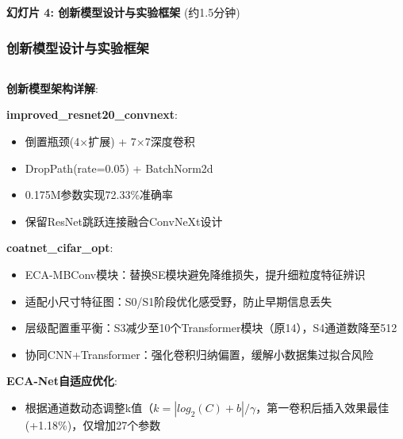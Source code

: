 \documentclass[10pt]{beamer}
\begin{document}
\begin{frame}{\textbf{幻灯片 4: 创新模型设计与实验框架} (约1.5分钟)}
\frametitle{创新模型设计与实验框架}

{\scriptsize
\begin{columns}[T]
    \begin{column}{0.48\textwidth}
        \textbf{创新模型架构详解}:
        
            \textbf{improved\_resnet20\_convnext}:
            \begin{itemize}
                \item 倒置瓶颈(4×扩展) + 7×7深度卷积
                \item DropPath(rate=0.05) + BatchNorm2d
                \item 0.175M参数实现72.33\%准确率
                \item 保留ResNet跳跃连接融合ConvNeXt设计
            \end{itemize}
            \textbf{coatnet\_cifar\_opt}:
            \begin{itemize}
                \item ECA-MBConv模块：替换SE模块避免降维损失，提升细粒度特征辨识
                \item 适配小尺寸特征图：S0/S1阶段优化感受野，防止早期信息丢失
                \item 层级配置重平衡：S3减少至10个Transformer模块（原14），S4通道数降至512
                \item 协同CNN+Transformer：强化卷积归纳偏置，缓解小数据集过拟合风险
            \end{itemize}
            \textbf{ECA-Net自适应优化}:
            \begin{itemize}
                \item 根据通道数动态调整k值（$k = |log_2(C) + b|/\gamma$，第一卷积后插入效果最佳(+1.18\%)，仅增加27个参数
            \end{itemize}
        

\end{column}
\end{columns}}
\end{frame}
\end{document}
